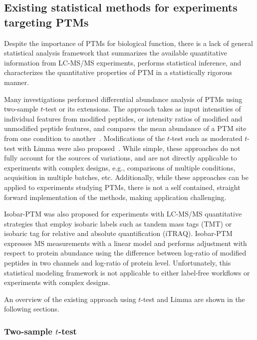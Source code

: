 \documentclass[mcp]{article}
\numberwithin{table}{section}
\begin{document}
\subsection*{Existing statistical methods for experiments targeting PTMs}

Despite the importance of PTMs for biological function, there is a lack of general statistical analysis framework that summarizes the available quantitative information from LC-MS/MS experiments, performs statistical inference, and characterizes the quantitative properties of PTM in a statistically rigorous manner. 

Many investigations performed differential abundance analysis of PTMs using two-sample $t$-test or its extensions.  The approach takes as input intensities of individual features from modified peptides, or intensity ratios of modified and unmodified peptide features, and compares the mean abundance of a PTM site from one condition to another~\cite{Schwammle2015}\cite{THOMAS2020}. Modifications of the $t$-test such as moderated $t$-test with Limma were also proposed~\cite{Ritchie_15a}\cite{Zhu}. While simple, these approaches do not fully account for the sources of variations, and are not directly applicable to experiments with complex designs, e.g., comparisons of multiple conditions, acquisition in multiple batches, etc. Additionally, while these approaches can be applied to experiments studying PTMs, there is not a self contained, straight forward implementation of the methods, making application challenging. 

Isobar-PTM was also proposed for experiments with LC-MS/MS quantitative strategies that employ isobaric labels such as tandem mass tags (TMT) or isobaric tag for relative and absolute quantification (iTRAQ)\cite{Breitwieser:2013}. Isobar-PTM expresses MS measurements with a linear model and performs adjustment with respect to protein abundance using the difference between log-ratio of modified peptides in two channels and log-ratio of protein level. Unfortunately, this statistical modeling framework is not applicable to either label-free workflows or experiments with complex designs. 

An overview of the existing approach using $t$-test and Limma are shown in the following sections.

\subsubsection*{Two-sample $t$-test}
\end{document}
